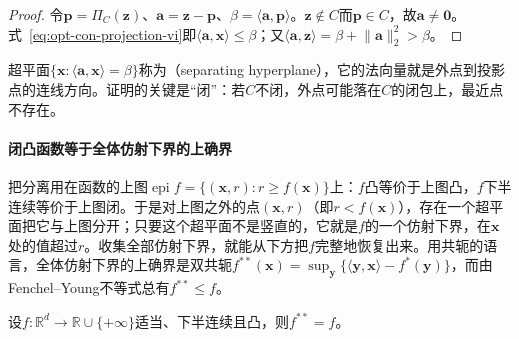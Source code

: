 \begin{proof}
令$\bm p=\Pi_C(\bm z)$、$\bm a=\bm z-\bm p$、$\beta=\langle\bm a,\bm p\rangle$。$\bm z\notin C$而$\bm p\in C$，故$\bm a\neq\bm0$。式~\eqref{eq:opt-con-projection-vi}即$\langle\bm a,\bm x\rangle\leq\beta$；又$\langle\bm a,\bm z\rangle=\beta+\lVert\bm a\rVert_2^2>\beta$。
\end{proof}

超平面$\{\bm x:\langle\bm a,\bm x\rangle=\beta\}$称为（separating hyperplane），它的法向量就是外点到投影点的连线方向。证明的关键是“闭”：若$C$不闭，外点可能落在$C$的闭包上，最近点不存在。

\paragraph{闭凸函数等于全体仿射下界的上确界}
把分离用在函数的上图$\operatorname{epi}f=\{(\bm x,r):r\geq f(\bm x)\}$上：$f$凸等价于上图凸，$f$下半连续等价于上图闭。于是对上图之外的点$(\bm x,r)$（即$r<f(\bm x)$），存在一个超平面把它与上图分开；只要这个超平面不是竖直的，它就是$f$的一个仿射下界，在$\bm x$处的值超过$r$。收集全部仿射下界，就能从下方把$f$完整地恢复出来。用共轭的语言，全体仿射下界的上确界是双共轭$f^{**}(\bm x)=\sup_{\bm y}\{\langle\bm y,\bm x\rangle-f^*(\bm y)\}$，而由Fenchel--Young不等式总有$f^{**}\leq f$。

\begin{theorem}
\label{thm:opt-con-fenchel-moreau}
设$f:\mathbb R^d\to\mathbb R\cup\{+\infty\}$适当、下半连续且凸，则$f^{**}=f$。
\end{theorem}

